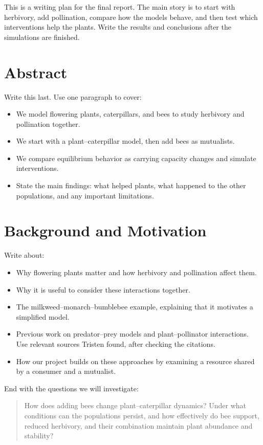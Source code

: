 \documentclass[11pt]{article}
\begin{document}
This is a writing plan for the final report. The main story is to start with
herbivory, add pollination, compare how the models behave, and then test which
interventions help the plants. Write the results and conclusions after the
simulations are finished.

\section{Abstract}

Write this last. Use one paragraph to cover:
\begin{itemize}
    \item We model flowering plants, caterpillars, and bees to study herbivory
    and pollination together.
    \item We start with a plant--caterpillar model, then add bees as mutualists.
    \item We compare equilibrium behavior as carrying capacity changes and
    simulate interventions.
    \item State the main findings: what helped plants, what happened to the
    other populations, and any important limitations.
\end{itemize}

\section{Background and Motivation}

Write about:
\begin{itemize}
    \item Why flowering plants matter and how herbivory and pollination
    affect them.
    \item Why it is useful to consider these interactions together.
    \item The milkweed--monarch--bumblebee example, explaining that it
    motivates a simplified model.
    \item Previous work on predator--prey models and plant--pollinator
    interactions. Use relevant sources Tristen found, after checking the
    citations.
    \item How our project builds on these approaches by examining a resource
    shared by a consumer and a mutualist.
\end{itemize}

End with the questions we will investigate:
\begin{quote}
How does adding bees change plant--caterpillar dynamics? Under what conditions
can the populations persist, and how effectively do bee support, reduced
herbivory, and their combination maintain plant abundance and stability?
\end{quote}
\end{document}
